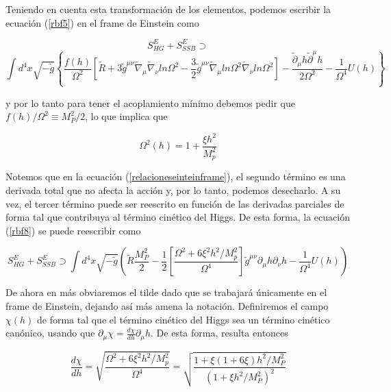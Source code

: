 Teniendo en cuenta esta transformación de los elementos, podemos escribir la ecuación (\ref{rbf5}) en el frame de Einstein como


$$
S_{HG}^{E}+S_{SSB}^{E}  \supset
$$
\begin{equation}\label{rbf8}
  \int d^{4} x \sqrt{-\widetilde{g}}\left\{ \frac{f(h)}{\Omega^{2}}\left[ \widetilde{R}+3\widetilde{g}^{\mu \nu} \widetilde{\nabla}_{\mu}\widetilde{\nabla}_{\nu} ln \Omega^{2}-\frac{3}{2} \widetilde{g}^{\mu \nu} \widetilde{\nabla}_{\mu} ln \Omega^{2} \widetilde{\nabla}_{\nu} ln \Omega ^{2}\right] -\frac{\widetilde{\partial}_{\mu}h \widetilde{\partial} ^{\mu} h}{2\Omega^{2}}-\frac{1}{\Omega^{4}} U(h)\right\}
\end{equation}
   




y por lo tanto para tener el acoplamiento mínimo debemos pedir que $f(h)/\Omega ^{2} \equiv M_{P}^{2}/2$, lo que implica que


\begin{equation}
\Omega ^{2} (h)=1+\frac{\xi h^{2}}{M_{p}^{2}}
\label{rbf9}
\end{equation}


Notemos que en la ecuación (\ref{relacioneseinteinframe}), el segundo término es una derivada total que no afecta la acción y, por lo tanto, podemos desecharlo. A su vez, el tercer término puede ser reescrito en función de las derivadas parciales de forma tal que contribuya al término cinético del Higgs. De esta forma, la ecuación (\ref{rbf8}) se puede reescribir como


\begin{equation}
S_{HG}^{E}+S_{SSB}^{E}\supset \int d^{4} x \sqrt{-\widetilde{g}} \left( \widetilde{R} \frac{M_{P}^{2}}{2}-\frac{1}{2} \left[ \frac{\Omega ^{2}+6 \xi^{2} h^{2}/M_{p}^{2}}{\Omega^{4}} \right] \widetilde{g}^{\mu \nu} \partial_{\mu}h \partial_{\nu}h-\frac{1}{\Omega^{4}}U(h) \right)
\label{rbf10}
\end{equation}



De ahora en más obviaremos el tilde dado que se trabajará únicamente en el frame de Einstein, dejando así más amena la notación. Definiremos el campo $\chi (h)$ de forma tal que el término cinético del Higgs sea un término cinético canónico, usando que $\partial _{\mu}\chi=\frac{d \chi}{d h} \partial _{\mu} h$. De esta forma, resulta entonces



\begin{equation}
\frac{d \chi}{dh}=\sqrt{\frac{\Omega ^{2}+6 \xi^{2} h^{2}/M_{p}^{2}}{\Omega^{4}}}=\sqrt{\frac{1+\xi(1+6\xi)h^{2}/M_{P}^{2}}{(1+\xi h^2/M_P^2)^2}}
\label{rbf11}
\end{equation}


